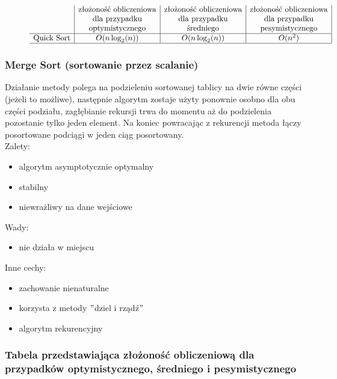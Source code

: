 \documentclass[polish,polish,a4paper]{article}
\begin{document}
\begin{spacing}{1.5}
\begin{figure}[H]
\begin{equation*}
\begin{array}{l|c|c|c|}
		&$złożoność obliczeniowa$&$złożoność obliczeniowa$&$złożoność obliczeniowa$\\
		&$dla przypadku$&$dla przypadku$&$dla przypadku$\\
		&$optymistycznego$&$średniego$&$pesymistycznego$\\
		\hline
		$Quick Sort$&O(n\log_{2}(n))&O(n\log_{2}(n))&O(n^2)\\
		\hline
		\end{array}
		\end{equation*}
	\end{figure}
	
			\subsubsection*{Merge Sort (sortowanie przez scalanie)}
			Działanie metody polega na podzieleniu sortowanej tablicy na dwie równe części (jeżeli to możliwe), następnie algorytm zostaje użyty ponownie osobno dla obu części podziału, zagłębianie rekursji trwa do momentu aż do podzielenia pozostanie tylko jeden element. Na koniec powracając z rekurencji metoda łączy posortowane podciągi w jeden ciąg posortowany.\\
			
	Zalety:
	\begin{itemize}
		\item algorytm asymptotycznie optymalny
		\item stabilny
		\item niewrażliwy na dane wejściowe
	\end{itemize}
	Wady:
	\begin{itemize}
		\item nie działa w miejscu
	\end{itemize}
	Inne cechy:
	\begin{itemize}
		\item zachowanie nienaturalne
		\item korzysta z metody $"$dziel i rządź$"$
		\item algorytm rekurencyjny
	\end{itemize}
	
	\subsubsection*{Tabela przedstawiająca złożoność obliczeniową dla przypadków optymistycznego, średniego i pesymistycznego} 
	\begin{figure}[H]
		

\end{figure}
\end{spacing}
\end{document}
